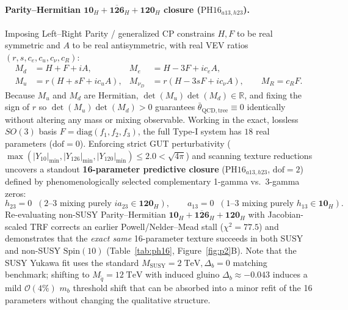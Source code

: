 \documentclass[11pt,a4paper]{article}
\begin{document}
\paragraph{Parity--Hermitian $\mathbf{10}_H + \overline{\mathbf{126}}_H + \mathbf{120}_H$ closure ($\mathrm{PH16}_{a13,h23}$).}
Imposing Left--Right Parity / generalized CP constrains $H, F$ to be real symmetric and $A$ to be real antisymmetric, with real VEV ratios $(r, s, c_e, c_u, c_\nu, c_R)$:
\begin{equation}
\begin{aligned}
    M_d &= H + F + iA, & M_e &= H - 3F + ic_e A, \\
    M_u &= r(H + sF + ic_u A), & M_{\nu_D} &= r(H - 3sF + ic_\nu A), \qquad M_R = c_R F.
\end{aligned}
\label{eq:ph-master}
\end{equation}
Because $M_u$ and $M_d$ are Hermitian, $\det(M_u)\det(M_d) \in \mathbb{R}$, and fixing the sign of $r$ so $\det(M_u)\det(M_d) > 0$ guarantees $\bar\theta_{\mathrm{QCD,tree}} \equiv 0$ identically without altering any mass or mixing observable. Working in the exact, lossless $SO(3)$ basis $F = \mathrm{diag}(f_1, f_2, f_3)$, the full Type-I system has $18$ real parameters ($\mathrm{dof} = 0$). Enforcing strict GUT perturbativity ($\max(|Y_{10}|_{\min}, |Y_{126}|_{\min}, |Y_{120}|_{\min}) \le 2.0 < \sqrt{4\pi}$) and scanning texture reductions uncovers a standout \textbf{16-parameter predictive closure} ($\mathrm{PH16}_{a13,h23}$, $\mathrm{dof} = 2$) defined by phenomenologically selected complementary 1-gamma vs.\ 3-gamma zeros:
\begin{equation}
    h_{23} = 0 \;\;(\text{2--3 mixing purely } i a_{23} \in \mathbf{120}_H), \qquad a_{13} = 0 \;\;(\text{1--3 mixing purely } h_{13} \in \mathbf{10}_H).
    \label{eq:ph16-zeros}
\end{equation}
Re-evaluating non-SUSY Parity--Hermitian $\mathbf{10}_H + \overline{\mathbf{126}}_H + \mathbf{120}_H$ with Jacobian-scaled TRF corrects an earlier Powell/Nelder--Mead stall ($\chi^2 = 77.5$) and demonstrates that the \emph{exact same} 16-parameter texture succeeds in both SUSY and non-SUSY $\mathrm{Spin}(10)$ (Table~\ref{tab:ph16}, Figure~\ref{fig:p2}B). Note that the SUSY Yukawa fit uses the standard $M_{\mathrm{SUSY}} = 2\;\mathrm{TeV}, \Delta_b = 0$ matching benchmark; shifting to $M_{\tilde q} = 12\;\mathrm{TeV}$ with induced gluino $\Delta_b \approx -0.043$ induces a mild $\mathcal{O}(4\%)$ $m_b$ threshold shift that can be absorbed into a minor refit of the 16 parameters without changing the qualitative structure.
\end{document}
